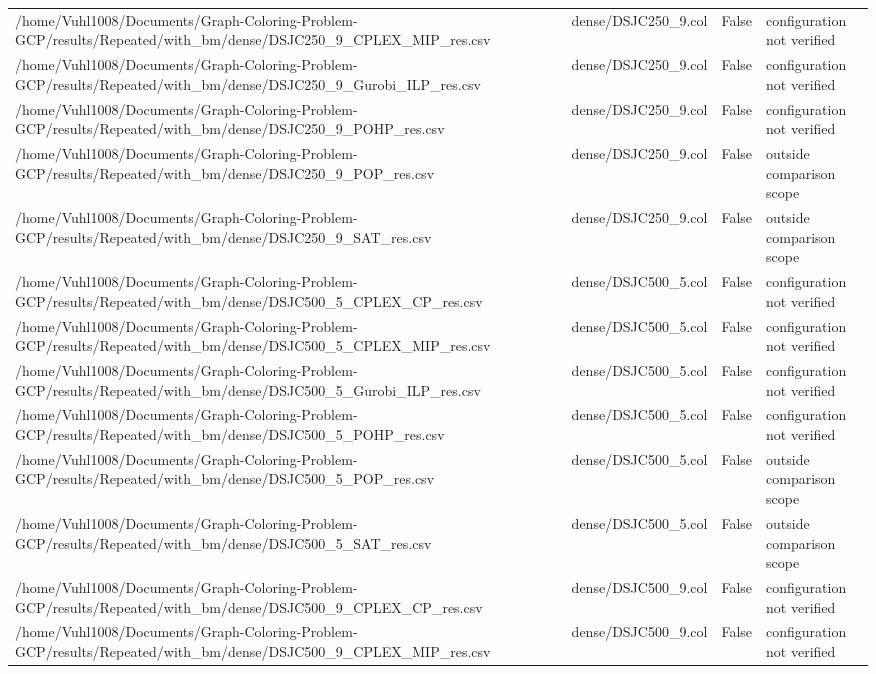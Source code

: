 \begin{table}[htbp]
\begin{tabular}{llll}
/home/Vuhl1008/Documents/Graph-Coloring-Problem-GCP/results/Repeated/with\_bm/dense/DSJC250\_9\_CPLEX\_MIP\_res.csv & dense/DSJC250\_9.col & False & configuration not verified \\
/home/Vuhl1008/Documents/Graph-Coloring-Problem-GCP/results/Repeated/with\_bm/dense/DSJC250\_9\_Gurobi\_ILP\_res.csv & dense/DSJC250\_9.col & False & configuration not verified \\
/home/Vuhl1008/Documents/Graph-Coloring-Problem-GCP/results/Repeated/with\_bm/dense/DSJC250\_9\_POHP\_res.csv & dense/DSJC250\_9.col & False & configuration not verified \\
/home/Vuhl1008/Documents/Graph-Coloring-Problem-GCP/results/Repeated/with\_bm/dense/DSJC250\_9\_POP\_res.csv & dense/DSJC250\_9.col & False & outside comparison scope \\
/home/Vuhl1008/Documents/Graph-Coloring-Problem-GCP/results/Repeated/with\_bm/dense/DSJC250\_9\_SAT\_res.csv & dense/DSJC250\_9.col & False & outside comparison scope \\
/home/Vuhl1008/Documents/Graph-Coloring-Problem-GCP/results/Repeated/with\_bm/dense/DSJC500\_5\_CPLEX\_CP\_res.csv & dense/DSJC500\_5.col & False & configuration not verified \\
/home/Vuhl1008/Documents/Graph-Coloring-Problem-GCP/results/Repeated/with\_bm/dense/DSJC500\_5\_CPLEX\_MIP\_res.csv & dense/DSJC500\_5.col & False & configuration not verified \\
/home/Vuhl1008/Documents/Graph-Coloring-Problem-GCP/results/Repeated/with\_bm/dense/DSJC500\_5\_Gurobi\_ILP\_res.csv & dense/DSJC500\_5.col & False & configuration not verified \\
/home/Vuhl1008/Documents/Graph-Coloring-Problem-GCP/results/Repeated/with\_bm/dense/DSJC500\_5\_POHP\_res.csv & dense/DSJC500\_5.col & False & configuration not verified \\
/home/Vuhl1008/Documents/Graph-Coloring-Problem-GCP/results/Repeated/with\_bm/dense/DSJC500\_5\_POP\_res.csv & dense/DSJC500\_5.col & False & outside comparison scope \\
/home/Vuhl1008/Documents/Graph-Coloring-Problem-GCP/results/Repeated/with\_bm/dense/DSJC500\_5\_SAT\_res.csv & dense/DSJC500\_5.col & False & outside comparison scope \\
/home/Vuhl1008/Documents/Graph-Coloring-Problem-GCP/results/Repeated/with\_bm/dense/DSJC500\_9\_CPLEX\_CP\_res.csv & dense/DSJC500\_9.col & False & configuration not verified \\
/home/Vuhl1008/Documents/Graph-Coloring-Problem-GCP/results/Repeated/with\_bm/dense/DSJC500\_9\_CPLEX\_MIP\_res.csv & dense/DSJC500\_9.col & False & configuration not verified \\

\end{tabular}
\end{table}
